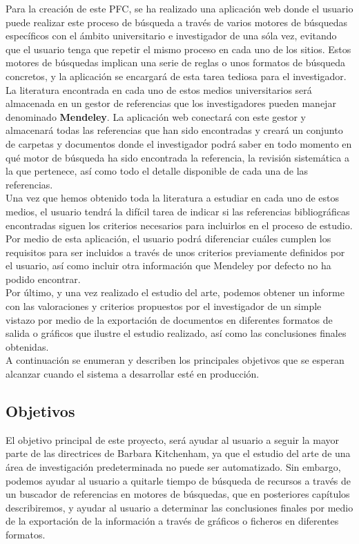 Para la creación de este PFC, se ha realizado una aplicación web donde el usuario puede realizar este proceso de búsqueda a través de varios motores de búsquedas específicos con el ámbito universitario e investigador de una sóla vez, evitando que el usuario tenga que repetir el mismo proceso en cada uno de los sitios. Estos motores de búsquedas implican una serie de reglas o unos formatos de búsqueda concretos, y la aplicación se encargará de esta tarea tediosa para el investigador.\\

La literatura encontrada en cada uno de estos medios universitarios será almacenada en un gestor de referencias que los investigadores pueden manejar denominado \textbf{Mendeley}.
La aplicación web conectará con este gestor y almacenará todas las referencias que han sido encontradas y creará un conjunto de carpetas y documentos donde el investigador podrá saber en todo momento en qué motor de búsqueda ha sido encontrada la referencia, la revisión sistemática a la que pertenece, así como todo el detalle disponible de cada una de las referencias.\\

Una vez que hemos obtenido toda la literatura a estudiar en cada uno de estos medios, el usuario tendrá la difícil tarea de indicar si las referencias bibliográficas encontradas siguen los criterios necesarios para incluirlos en el proceso de estudio. Por medio de esta aplicación, el usuario podrá diferenciar cuáles cumplen los requisitos para ser incluidos a través de unos criterios previamente definidos por el usuario, así como incluir otra información que Mendeley por defecto no ha podido encontrar.\\

Por último, y una vez realizado el estudio del arte, podemos obtener un informe con las valoraciones y criterios propuestos por el investigador de un simple vistazo por medio de la exportación de documentos en diferentes formatos de salida o gráficos que ilustre el estudio realizado, así como las conclusiones finales obtenidas.\\

A continuación se enumeran y describen los principales objetivos que se esperan alcanzar cuando el sistema a desarrollar esté en producción.

\subsection{Objetivos}
El objetivo principal de este proyecto, será ayudar al usuario a seguir la mayor parte de las directrices de Barbara Kitchenham, ya que el estudio del arte de una área de investigación predeterminada no puede ser automatizado. Sin embargo, podemos ayudar al usuario a quitarle tiempo de búsqueda de recursos a través de un buscador de referencias en motores de búsquedas, que en posteriores capítulos describiremos, y ayudar al usuario a determinar las conclusiones finales por medio de la exportación de la información a través de gráficos o ficheros en diferentes formatos.\\

